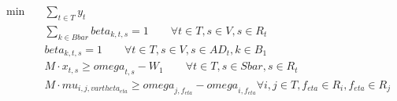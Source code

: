 \begin{align}
  \min\quad & \sum_{t \in T} y_{t} \tag{eq\_0007\_a} \\
  & \sum_{k \in Bbar} \mathit{beta}_{k,t,s} = 1 \qquad \forall t \in T, s \in V, s \in R_{t} \tag{eq\_0015} \\
  & \mathit{beta}_{k,t,s} = 1 \qquad \forall t \in T, s \in V, s \in AD_{t}, k \in B_1 \tag{eq\_0017} \\
  & M \cdot x_{t,s} \ge \mathit{omega}_{t,s} - W_{1} \qquad \forall t \in T, s \in Sbar, s \in R_{t} \tag{eq\_0018} \\
  & M \cdot \mathit{mu}_{i , j , \mathit{vartheta}_{\mathit{eta}}} \geq \mathit{omega}_{j , f_{\mathit{eta}}} - \mathit{omega}_{i , f_{\mathit{eta}}} \forall i , j \in T , f_{\mathit{eta}} \in R_{i} , f_{\mathit{eta}} \in R_{j} \tag{eq\_0025} \\
\end{align}

